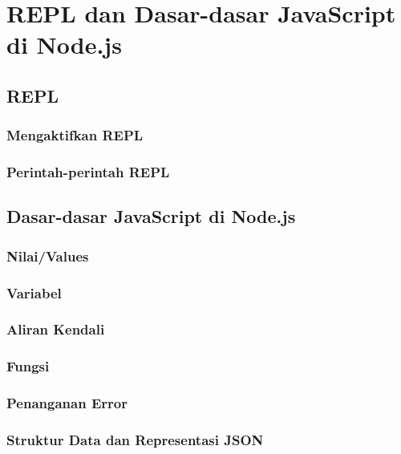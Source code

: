 \chapter{REPL dan Dasar-dasar JavaScript di Node.js}

\section{REPL}


\subsection{Mengaktifkan REPL}


\subsection{Perintah-perintah REPL}


\section{Dasar-dasar JavaScript di Node.js}

\subsection{Nilai/Values}


\subsection{Variabel}


\subsection{Aliran Kendali}

\subsection{Fungsi}

\subsection{Penanganan Error}

\subsection{Struktur Data dan Representasi JSON}

